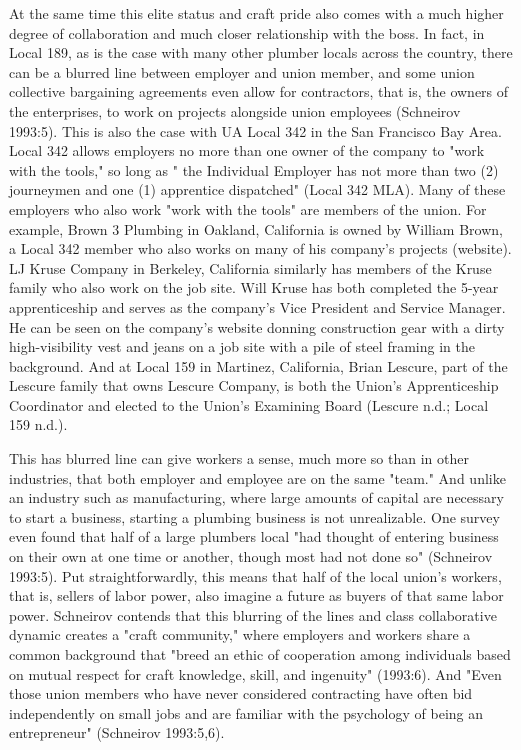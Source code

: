 \documentclass[12pt]{article}
\begin{document}
At the same time this elite status and craft pride also comes with a much higher degree of collaboration and much closer relationship with the boss. In fact, in Local 189, as is the case with many other plumber locals across the country, there can be a blurred line between employer and union member, and some union collective bargaining agreements even allow for contractors, that is, the owners of the enterprises, to work on projects alongside union employees (Schneirov 1993:5). This is also the case with UA Local 342 in the San Francisco Bay Area. Local 342 allows employers no more than one owner of the company to "work with the tools," so long as " the Individual Employer has not more than two (2) journeymen and one (1) apprentice dispatched" (Local 342 MLA). Many of these employers who also work "work with the tools" are members of the union. For example, Brown 3 Plumbing in Oakland, California is owned by William Brown, a Local 342 member who also works on many of his company’s projects (website). LJ Kruse Company in Berkeley, California similarly has members of the Kruse family who also work on the job site. Will Kruse has both completed the 5-year apprenticeship and serves as the company’s Vice President and Service Manager. He can be seen on the company’s website donning construction gear with a dirty high-visibility vest and jeans on a job site with a pile of steel framing in the background. And at Local 159 in Martinez, California, Brian Lescure, part of the Lescure family that owns Lescure Company, is both the Union’s Apprenticeship Coordinator and elected to the Union’s Examining Board (Lescure n.d.; Local 159 n.d.).

This has blurred line can give workers a sense, much more so than in other industries, that both employer and employee are on the same "team." And unlike an industry such as manufacturing, where large amounts of capital are necessary to start a business, starting a plumbing business is not unrealizable. One survey even found that half of a large plumbers local "had thought of entering business on their own at one time or another, though most had not done so" (Schneirov 1993:5). Put straightforwardly, this means that half of the local union’s workers, that is, sellers of labor power, also imagine a future as buyers of that same labor power. Schneirov contends that this blurring of the lines and class collaborative dynamic creates a "craft community," where employers and workers share a common background that "breed an ethic of cooperation among individuals based on mutual respect for craft knowledge, skill, and ingenuity" (1993:6). And "Even those union members who have never considered contracting have often bid independently on small jobs and are familiar with the psychology of being an entrepreneur" (Schneirov 1993:5,6). 
\end{document}
